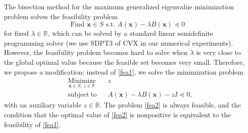 \documentclass[sn-mathphys,Numbered]{sn-jnl}%
\theoremstyle{thmstyleone}%
\theoremstyle{thmstyletwo}%
\theoremstyle{thmstylethree}%
\newcommand{\e}[1]{\begin{equation}#1\end{equation}}
\begin{document}
\begin{appendices}
The bisection method for the maximum generalized eigenvalue minimization problem \cite{achtziger07siam} solves the feasibility problem
\e{
\text{Find }\bm{x}\in S\text{ s.t. }A(\bm{x})-\lambda B(\bm{x})\preceq 0
\label{fea1}
}
for fixed $\lambda\in\mathbb{R}$, which can be solved by a standard linear semidefinite programming solver (we use SDPT3 of CVX in our numerical experiments). However, the feasibility problem becomes hard to solve when $\lambda$ is very close to the global optimal value because the feasible set becomes very small. Therefore, we propose a modification; instead of \eqref{fea1}, we solve the minimization problem
\e{
\begin{aligned}
& \underset{\bm{x}\in S,\ z\in\mathbb{R}}{\mathrm{Minimize}} & & z \\
& \mathrm{subject\ to} & & A(\bm{x})-\lambda B(\bm{x})-zI\preceq 0,
\label{fea2}
\end{aligned}
}
with an auxiliary variable $z\in\mathbb{R}$. The problem \eqref{fea2} is always feasible, and the condition that the optimal value of \eqref{fea2} is nonpositive is equivalent to the feasibility of \eqref{fea1}.




\end{appendices}


\end{document}
